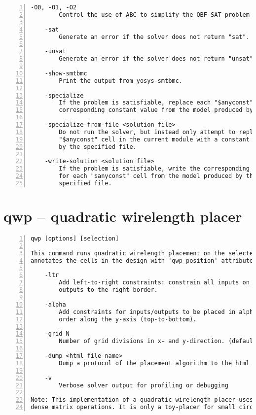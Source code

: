 \begin{lstlisting}[numbers=left,frame=single]
    -O0, -O1, -O2
        Control the use of ABC to simplify the QBF-SAT problem before solving.

    -sat
        Generate an error if the solver does not return "sat".

    -unsat
        Generate an error if the solver does not return "unsat".

    -show-smtbmc
        Print the output from yosys-smtbmc.

    -specialize
        If the problem is satisfiable, replace each "$anyconst" cell with its
        corresponding constant value from the model produced by the solver.

    -specialize-from-file <solution file>
        Do not run the solver, but instead only attempt to replace each
        "$anyconst" cell in the current module with a constant value provided
        by the specified file.

    -write-solution <solution file>
        If the problem is satisfiable, write the corresponding constant value
        for each "$anyconst" cell from the model produced by the solver to the
        specified file.
\end{lstlisting}

\section{qwp -- quadratic wirelength placer}
\label{cmd:qwp}
\begin{lstlisting}[numbers=left,frame=single]
    qwp [options] [selection]

This command runs quadratic wirelength placement on the selected modules and
annotates the cells in the design with 'qwp_position' attributes.

    -ltr
        Add left-to-right constraints: constrain all inputs on the left border
        outputs to the right border.

    -alpha
        Add constraints for inputs/outputs to be placed in alphanumerical
        order along the y-axis (top-to-bottom).

    -grid N
        Number of grid divisions in x- and y-direction. (default=16)

    -dump <html_file_name>
        Dump a protocol of the placement algorithm to the html file.

    -v
        Verbose solver output for profiling or debugging

Note: This implementation of a quadratic wirelength placer uses exact
dense matrix operations. It is only a toy-placer for small circuits.
\end{lstlisting}

